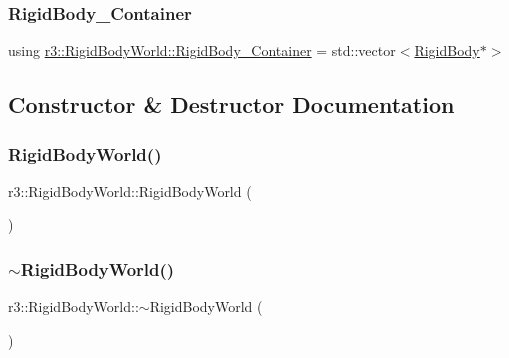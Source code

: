 \subsubsection{\texorpdfstring{Rigid\+Body\+\_\+\+Container}{RigidBody\_Container}}
{\footnotesize\ttfamily using \mbox{\hyperlink{classr3_1_1_rigid_body_world_abe8c123eee198b6f8eca079e71302bcb}{r3\+::\+Rigid\+Body\+World\+::\+Rigid\+Body\+\_\+\+Container}} =  std\+::vector$<$\mbox{\hyperlink{classr3_1_1_rigid_body}{Rigid\+Body}}$\ast$$>$}



\subsection{Constructor \& Destructor Documentation}
\mbox{\label{classr3_1_1_rigid_body_world_ae9358def6c2b1ea21d38059242fec505}} 
\subsubsection{\texorpdfstring{Rigid\+Body\+World()}{RigidBodyWorld()}}
{\footnotesize\ttfamily r3\+::\+Rigid\+Body\+World\+::\+Rigid\+Body\+World (\begin{DoxyParamCaption}{ }\end{DoxyParamCaption})\hspace{0.3cm}{\ttfamily [default]}}

\mbox{\label{classr3_1_1_rigid_body_world_add6c229831a203d61ee8f5e2294b4192}} 
\subsubsection{\texorpdfstring{$\sim$\+Rigid\+Body\+World()}{~RigidBodyWorld()}}
{\footnotesize\ttfamily r3\+::\+Rigid\+Body\+World\+::$\sim$\+Rigid\+Body\+World (\begin{DoxyParamCaption}{ }\end{DoxyParamCaption})\hspace{0.3cm}{\ttfamily [default]}}



